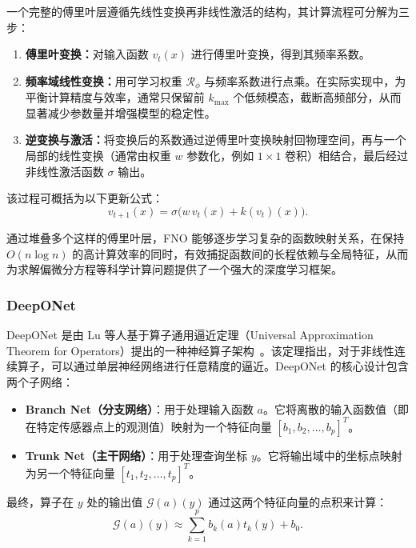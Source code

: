 一个完整的傅里叶层遵循先线性变换再非线性激活的结构，其计算流程可分解为三步：
\begin{enumerate}
    \item \textbf{傅里叶变换：}对输入函数 $v_t(x)$ 进行傅里叶变换，得到其频率系数。
    \item \textbf{频率域线性变换：}用可学习权重 $\mathcal{R}_\phi$ 与频率系数进行点乘。在实际实现中，为平衡计算精度与效率，通常只保留前 $k_{\text{max}}$ 个低频模态，截断高频部分，从而显著减少参数量并增强模型的稳定性。
    \item \textbf{逆变换与激活：}将变换后的系数通过逆傅里叶变换映射回物理空间，再与一个局部的线性变换（通常由权重 $w$ 参数化，例如 $1\times 1$ 卷积）相结合，最后经过非线性激活函数 $\sigma$ 输出。
\end{enumerate}

该过程可概括为以下更新公式：
\begin{equation}
    v_{t+1}(x) = \sigma \big( w\, v_t(x) + k(v_t)(x) \big).
\end{equation}

通过堆叠多个这样的傅里叶层，FNO 能够逐步学习复杂的函数映射关系，在保持 $ O(n \log n) $ 的高计算效率的同时，有效捕捉函数间的长程依赖与全局特征，从而为求解偏微分方程等科学计算问题提供了一个强大的深度学习框架。

\subsubsection{DeepONet}
DeepONet 是由 Lu 等人基于算子通用逼近定理（Universal Approximation Theorem for Operators）提出的一种神经算子架构~\cite{lu2021learning,jin2022mionet,wang2021learning,lu2022multifidelity,zhu2023reliable}。该定理指出，对于非线性连续算子，可以通过单层神经网络进行任意精度的逼近。DeepONet 的核心设计包含两个子网络：
\begin{itemize}
    \item \textbf{Branch Net（分支网络）}：用于处理输入函数 $a$。它将离散的输入函数值（即在特定传感器点上的观测值）映射为一个特征向量 $[b_1, b_2, \dots, b_p]^T$。
    \item \textbf{Trunk Net（主干网络）}：用于处理查询坐标 $y$。它将输出域中的坐标点映射为另一个特征向量 $[t_1, t_2, \dots, t_p]^T$。
\end{itemize}
最终，算子在 $y$ 处的输出值 $\mathcal{G}(a)(y)$ 通过这两个特征向量的点积来计算：
\begin{equation}
    \mathcal{G}(a)(y) \approx \sum_{k=1}^p b_k(a) t_k(y) + b_0.
\end{equation}

